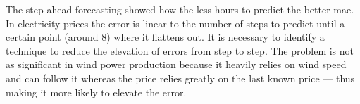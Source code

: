 The step-ahead forecasting showed how the less hours to predict the better mae. In electricity prices the error is linear to the number of steps to predict until a certain point (around 8) where it flattens out. It is necessary to identify a technique to reduce the elevation of errors from step to step. The problem is not as significant in wind power production because it heavily relies on wind speed and can follow it whereas the price relies greatly on the last known price --- thus making it more likely to elevate the error. 